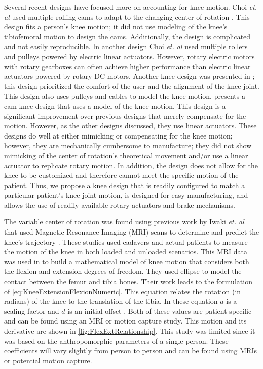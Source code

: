 Several recent designs have focused more on accounting for knee motion. Choi \textit{et. al} used multiple rolling cams to adapt to the changing center of rotation \cite{choi2017development}. This design fits a person's knee motion; it did not use modeling of the knee's tibiofemoral motion to design the cams. Additionally, the design is complicated and not easily reproducible. In another design Choi \textit{et. al} used multiple rollers and pulleys powered by electric linear actuators. However, rotary electric motors with rotary gearboxes can often achieve higher performance than electric linear actuators powered by rotary DC motors. Another knee design was presented in \cite{wang2018comfort}; this design prioritized the comfort of the user and the alignment of the knee joint. This design also uses pulleys and cables to model the knee motion. \cite{AdaptiveKneeJoint} presents a cam knee design that uses a model of the knee motion. This design is a significant improvement over previous designs that merely compensate for the motion. However, as the other designs discussed, they use linear actuators.  These designs do well at either mimicking or compensating for the knee motion; however, they are mechanically cumbersome to manufacture; they did not show mimicking of the center of rotation's theoretical movement and/or use a linear actuator to replicate rotary motion. In addition, the design does not allow for the knee to be customized and therefore cannot meet the specific motion of the patient. Thus, we propose a knee design that is readily configured to match a particular patient's knee joint motion, is designed for easy manufacturing, and allows the use of readily available rotary actuators and brake mechanisms.

The variable center of rotation was found using previous work by Iwaki \textit{et. al} that used Magnetic Resonance Imaging (MRI) scans to determine and predict the knee's trajectory \cite{MRIKneeShape_Loaded, MRIKneeShape_Unloaded}. These studies used cadavers and actual patients to measure the motion of the knee in both loaded and unloaded scenarios. This MRI data was used in \cite{KinDynKneeJoint} to build a mathematical model of knee motion that considers both the flexion and extension degrees of freedom. They used ellipse to model the contact between the femur and tibia bones. Their work leads to the formulation of \autoref{eq:KneeExtensionFlexionNumeric}. This equation relates the rotation (in radians) of the knee to the translation of the tibia. In these equation $a$ is a scaling factor and $d$ is an initial offset \cite{wang2013adaptive}. Both of these values are patient specific and can be found using an MRI or motion capture study. This motion and its derivative are shown in \autoref{fig:FlexExtRelationship}. This study was limited since it was based on the anthropomorphic parameters of a single person. These coefficients will vary slightly from person to person and can be found using MRIs or potential motion capture. 

